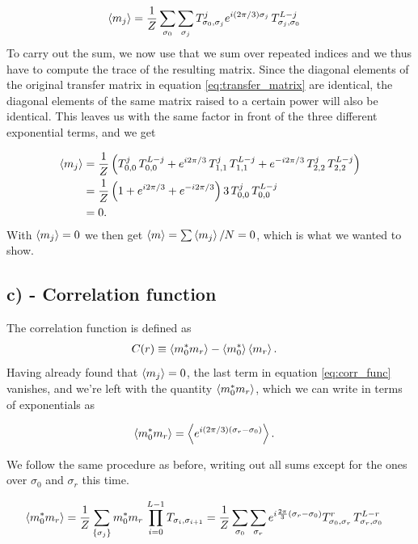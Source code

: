 \documentclass[reprint,english,notitlepage,aps,nobalancelastpage,nofootinbib]{revtex4-1}
\newcommand{\closed}[1]{\left(#1\right)}
\newcommand{\sumstate}{\sum_{\{\sigma_j\}}}
\newcommand{\prodstate}{\prod_{i=0}^{L-1}}
\newcommand{\T}[1]{T_{\sigma_{#1},\sigma_{#1 + 1}}}
\newcommand{\mj}{m_j}
\begin{document}
\begin{align*} 
	\expval{\mj} &= \frac{1}{Z} \sum_{\sigma_0} \sum_{\sigma_j} T_{\sigma_0,\sigma_j}^j e^{i(2\pi/3)\sigma_j} \,T_{\sigma_j,\sigma_0}^{L-j}
\end{align*}
To carry out the sum, we now use that we sum over repeated indices and we thus have to compute the trace of the resulting matrix. Since the diagonal elements of the original transfer matrix in equation \eqref{eq:transfer_matrix} are identical, the diagonal elements of the same matrix raised to a certain power will also be identical. This leaves us with the same factor in front of the three different exponential terms, and we get 

\begin{align*}
	\expval{\mj} &= \frac{1}{Z} \closed{T_{0,0}^j\,T_{0,0}^{L-j} + e^{i2\pi/3} \,T_{1,1}^j\,T_{1,1}^{L-j} + e^{-i2\pi/3}\,T_{2,2}^j\,T_{2,2}^{L-j}} \\ 
	&= \frac{1}{Z} \closed{1 + e^{i2\pi/3} + e^{-i2\pi/3}} 3\,T_{0,0}^{j} \, T_{0,0}^{L-j} \\ 
	&= 0.
\end{align*}  
With $\expval{\mj}=0$ we then get $\expval{m}=\sum \expval{\mj}/N=0$, which is what we wanted to show.


\subsection*{c) - Correlation function}
The correlation function is defined as 
\begin{align} \label{eq:corr_func}
	C(r) &\equiv \expval{m_0^* m_r} - \expval{m_0^*}\expval{m_r}.
\end{align}
Having already found that $\expval{\mj}=0$, the last term in equation \eqref{eq:corr_func} vanishes, and we're left with the quantity $\expval{m_0^* m_r}$, which we can write in terms of exponentials as 

\begin{align*}
	\expval{m_0^* m_r} &= \expval{e^{i(2\pi/3)(\sigma_r - \sigma_0)}}.
\end{align*}

We follow the same procedure as before, writing out all sums except for the ones over $\sigma_0$ and $\sigma_r$ this time. 

\begin{align*}
	\expval{m_0^* m_r} &= \frac{1}{Z} \sumstate m_0^* m_r \, \prodstate \T{i} = \frac{1}{Z} \sum_{\sigma_0} \sum_{\sigma_r} e^{i\frac{2\pi}{3}(\sigma_r-\sigma_0)} T_{\sigma_0,\sigma_r}^{r} \, T_{\sigma_r,\sigma_0}^{L-r} 
\end{align*}
\end{document}
